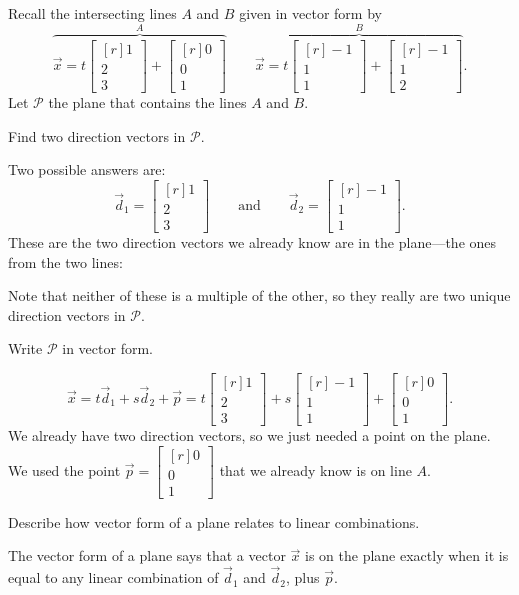 \documentclass{problemset}
\newcommand{\mat}[1]{\begin{bmatrix*}[r]#1\end{bmatrix*}}
\begin{document}
	\question
	Recall the intersecting lines $A$ and $B$ given in vector form by
	\[
		\overbrace{\vec x=t\mat{1\\2\\3}+\mat{0\\0\\1}}^{\displaystyle A}
		\qquad
		\overbrace{\vec x=t\mat{-1\\1\\1}+\mat{-1\\1\\2}}^{\displaystyle B}.
	\]
	Let $\mathcal P$ the plane that contains the lines $A$ and $B$.
	\begin{parts}
		\item Find two direction vectors in $\mathcal P$.
			\begin{solution}
				Two possible answers are:
				\[
					\vec d_1 = \mat{1\\2\\3}
					\qquad \text{and} \qquad
					\vec d_2 = \mat{-1\\1\\1}.
				\]
				These are the two direction vectors we already know are in the 
				plane---the ones from the two lines:
				
				Note that neither of these is a multiple of the other, so they 
				really are two unique direction vectors in $\mathcal P$.
			\end{solution}
		\item Write $\mathcal P$ in vector form.
			\begin{solution}
				\[
					\vec x = t\vec d_1 +s\vec d_2+\vec p
					= t \mat{1\\2\\3} + s \mat{-1\\1\\1} + \mat{0\\0\\1}.
				\]
				We already have two direction vectors, so we just needed a point
				on the plane. We used the point $\vec p = \mat{0\\0\\1}$ 
				that we already know is on line $A$. 
			\end{solution}
		\item Describe how vector form of a plane relates to linear
			combinations.
			\begin{solution}
				The vector form of a plane says that a vector $\vec x$ is on the
				plane exactly when it is equal to any linear combination of 
				$\vec d_1$ and $\vec d_2$, plus $\vec p$. 


\end{solution}
\end{parts}
\end{document}
